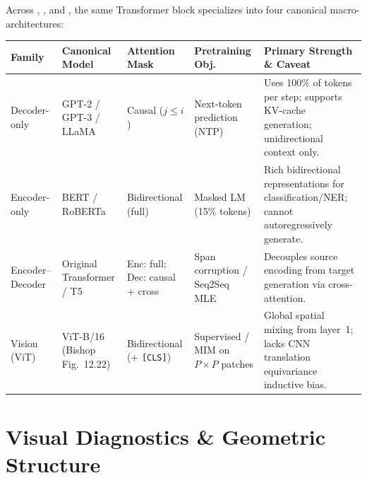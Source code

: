 \documentclass[../../../../master.tex]{subfiles}
\begin{document}
\begin{crossbook}
{\raggedright Across , , and , the same Transformer block specializes into four canonical macro-architectures:\par}
\begin{center}
\footnotesize
\setlength{\tabcolsep}{4pt}
\begin{tabularx}{\linewidth}{@{}p{2.0cm} p{2.3cm} p{2.1cm} p{2.3cm} >{\raggedright\arraybackslash}X@{}}
\toprule
\textbf{Family} & \textbf{Canonical Model} & \textbf{Attention Mask} & \textbf{Pretraining Obj.} & \textbf{Primary Strength \& Caveat} \\
\midrule
Decoder-only & GPT-2 / GPT-3 / LLaMA & Causal ($j \le i$) & Next-token prediction (NTP) & Uses 100\% of tokens per step; supports KV-cache generation; unidirectional context only. \\
Encoder-only & BERT / RoBERTa & Bidirectional (full) & Masked LM (15\% tokens) & Rich bidirectional representations for classification/NER; cannot autoregressively generate. \\
Encoder--Decoder & Original Transformer / T5 & Enc: full; Dec: causal + cross & Span corruption / Seq2Seq MLE & Decouples source encoding from target generation via cross-attention. \\
Vision (ViT) & ViT-B/16 (Bishop Fig.~12.22) & Bidirectional (+ \texttt{[CLS]}) & Supervised / MIM on $P \times P$ patches & Global spatial mixing from layer~1; lacks CNN translation equivariance inductive bias. \\
\bottomrule
\end{tabularx}
\end{center}
\label{tab:attn:arch_compare}
\end{crossbook}


\section{Visual Diagnostics \& Geometric Structure}
\label{sec:attn:visuals}
\end{document}
